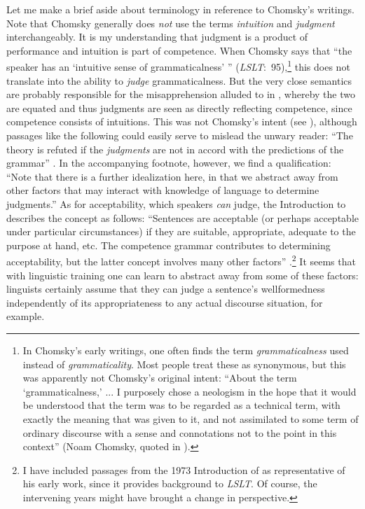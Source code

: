 Let me make a brief aside about terminology in reference to Chomsky's writings. Note that Chomsky generally does \textit{not} use the terms \textit{intuition} and \textit{judgment} interchangeably. It is my understanding that judgment is a product of performance and intuition is part of competence. When Chomsky says that ``the speaker has an `intuitive sense of grammaticalness' '' (\textit{LSLT}:~95),\footnote{In Chomsky's early writings, one often finds the term \textit{grammaticalness} used instead of \textit{grammaticality}. Most people treat these as synonymous, but this was apparently not Chomsky's original intent: ``About the term `grammaticalness,' ... I purposely chose a neologism in the hope that it would be understood that the term was to be regarded as a technical term, with exactly the meaning that was given to it, and not assimilated to some term of ordinary discourse with a sense and connotations not to the point in this context'' (Noam Chomsky, quoted in \citet[14]{Paikeday1985}).
}
this does not translate into the ability to \textit{judge} grammaticalness. But the very close semantics are probably responsible for the misapprehension alluded to in , whereby the two are equated and thus judgments are seen as directly reflecting competence, since competence consists of intuitions. This was not Chomsky's intent (see \citet[21]{Chomsky1965}), although passages like the following could easily serve to mislead the unwary reader: ``The theory is refuted if the \textit{judgments} are not in accord with the predictions of the grammar'' \citep[36]{Chomsky1985}. In the accompanying footnote, however, we find a qualification: ``Note that there is a further idealization here, in that we abstract away from other factors that may interact with knowledge of language to determine judgments.'' As for acceptability, which speakers \textit{can} judge, the Introduction to \citet{Chomsky1985} describes the concept as follows: ``Sentences are acceptable (or perhaps acceptable under particular circumstances) if they are suitable, appropriate, adequate to the purpose at hand, etc. The competence grammar contributes to determining acceptability, but the latter concept involves many other factors'' \citep[8]{Chomsky1985}.\footnote{I have included passages from the 1973 Introduction of \citet{Chomsky1985} as representative of his early work, since it provides background to \textit{LSLT}. Of course, the intervening years might have brought a change in perspective.}
It seems that with linguistic training one can learn to abstract away from some of these factors: linguists certainly assume that they can judge a sentence's wellformedness independently of its appropriateness to any actual discourse situation, for example.

